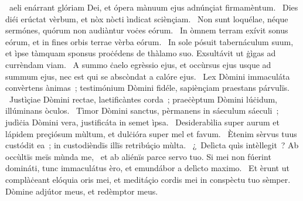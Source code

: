 \psalmChapterWithInscription{}
{ }
{%
~aeli enárrant glóriam Dei, et ópera mànuum ejus adnúnçiat firmamèntum. 
~Dies diéi erúctat vèrbum, et nòx nòcti ìndicat sciènçiam. 
~Non sunt loquélae, néque sermónes, quórum non audiàntur voċes eórum. 
~In òmnem terram exívit sonus eórum, et in fines orbis terrae vèrba eórum. 
~In sole pósuit tabernáculum suum, et ìpse tàmquam sponsus proċédens de thàlamo suo. Exsultávit ut ġìgas ad currèndam viam. 
~A summo ċaelo egrèssio ejus, et occùrsus ejus usque ad summum ejus, nec est qui se abscòndat a calóre ejus. 
~Lex Dòmini immaculáta convèrtens ànimas~; testimónium Dòmini fidéle, sapiènçiam praestans párvulïs. 
~Justìçiae Dòmini rectae, laetificàntes corda~; praeċèptum Dòmini lúċidum, illúminans òculos. 
~Tìmor Dòmini sanctus, pèrmanens in sáeculum sáeculi~; judìċia Dòmini vera, justificáta in semet ìpsa. 
~Desiderabìlia super aurum et lápidem preçiósum mùltum, et dulċióra super mel et favum. 
~Ètenim sèrvus tuus custódit ea~; in custodièndïs illïs retribúçio mùlta. 
~¿~Delìcta quìs intèllegit~? Ab occùltïs meïs mùnda me, 
~et ab aliénïs parce servo tuo. Si mei non fúerint domináti, tunc immaculátus èro, et emundábor a delìcto maximo. 
~Et èrunt ut complàċeant elóquia oris mei, et meditáçio cordis mei in conspèctu tuo sèmper. Dòmine adjútor meus, et redèmptor meus. 
}
